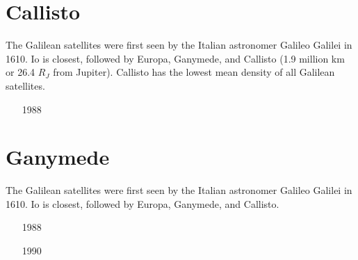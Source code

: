 \begin{small}
\begin{itemize}
\item[\twothousandeight] 
\item[\twothousandnine]
\item[\twothousandten]
\item[\twothousandtwelve] 
\item[\twothousandthirteen] 
\item[\twothousandfourteen]
\item[\twothousandtwentytwo] 
\end{itemize}
\end{small}

\section{Callisto}

The Galilean satellites were first seen by the Italian astronomer Galileo Galilei in 1610. 
Io is closest, followed by Europa, Ganymede, and Callisto (1.9 million km or
26.4 $R_J$ from Jupiter). Callisto has the lowest mean density of all Galilean satellites.

\begin{small}
\begin{itemize}
\item[1988]
\item[\twothousandfour]
\item[\twothousandfive]
\item[\twothousandsix]
\end{itemize}
\end{small}

\section{Ganymede}

The Galilean satellites were first seen by the Italian astronomer Galileo Galilei in 1610. 
Io is closest, followed by Europa, Ganymede, and Callisto.

\begin{small}
\begin{itemize}
\item[1988]
 \\ 
\item[1990]
\item[\twothousandsix]
\item[\twothousandfourteen]
\end{itemize}
\end{small}


